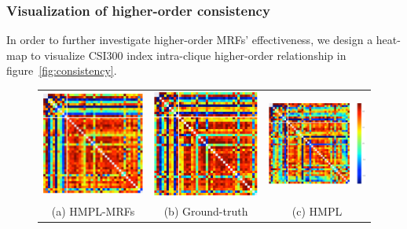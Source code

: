 \documentclass[sigconf, anonymous, review]{acmart}
\begin{document}
\subsubsection{Visualization of higher-order consistency}

In order to further investigate higher-order MRFs' effectiveness,
we design a heat-map to visualize CSI300 index intra-clique
higher-order relationship in figure~\ref{fig:consistency}.

\begin{figure}[t]
  \centering
  \setlength{\tabcolsep}{20pt}
  \begin{tabular}{ccc}
    \includegraphics[width=0.5\columnwidth]{Methodology/figures/mrf.png}&
                                                                           \includegraphics[width=0.5\columnwidth]{Methodology/figures/gt.png}&
\includegraphics[width=0.59\columnwidth]{Methodology/figures/hmpl.png}\\                                                                        {\small (a) HMPL-MRFs} & {\small (b) Ground-truth} & {\small (c) HMPL} 

\end{tabular}
\end{figure}
\end{document}

